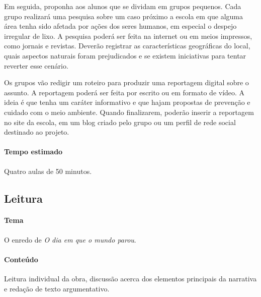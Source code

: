 \documentclass[11pt]{extarticle}
\begin{document}
Em seguida, proponha aos alunos que se dividam em grupos pequenos. Cada grupo realizará uma pesquisa sobre um caso próximo a escola em que alguma área tenha sido afetada por ações dos seres humanos, em especial o despejo irregular de lixo. A pesquisa poderá ser feita na internet ou em meios impressos, como jornais e revistas. Deverão registrar as características geográficas do local, quais aspectos naturais foram prejudicados e se existem iniciativas para tentar reverter esse cenário.


Os grupos vão redigir um roteiro para produzir uma reportagem digital sobre o assunto. A reportagem poderá ser feita por escrito ou em formato de vídeo. A ideia é que tenha um caráter informativo e que hajam propostas de prevenção e cuidado com o meio ambiente. Quando finalizarem, poderão inserir a reportagem no site da escola, em um blog criado pelo grupo ou um perfil de rede social destinado ao projeto.

\paragraph{Tempo estimado} Quatro aulas de 50 minutos.

\subsection{Leitura}


\paragraph{Tema} O enredo de \textit{O dia em que o mundo parou}.

\paragraph{Conteúdo} Leitura individual da obra, discussão acerca dos elementos principais da narrativa e redação de texto argumentativo.
\end{document}
